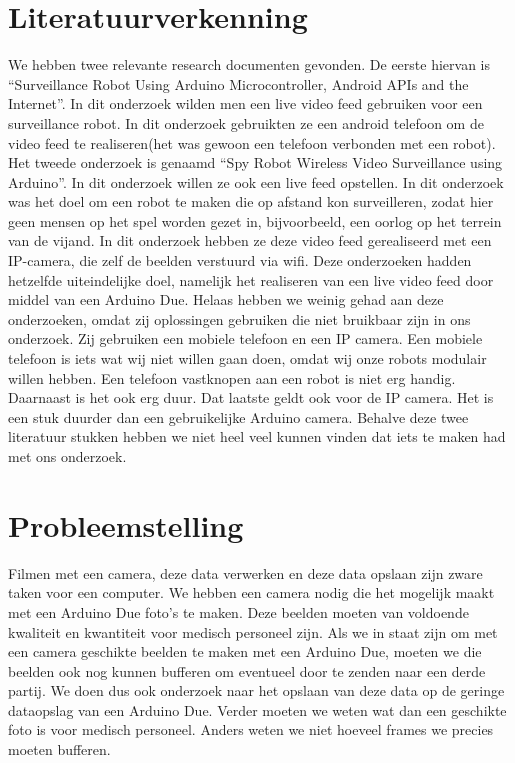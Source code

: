 \documentclass{article}
\begin{document}
\section{Literatuurverkenning}
We hebben twee relevante research documenten gevonden.
De eerste hiervan is “Surveillance Robot Using Arduino Microcontroller, Android APIs and the Internet”. In dit onderzoek wilden men een live video feed gebruiken voor een surveillance robot. In dit onderzoek gebruikten ze een android telefoon om de video feed te realiseren(het was gewoon een telefoon verbonden met een robot). 
Het tweede onderzoek is genaamd “Spy Robot Wireless Video Surveillance using Arduino”. 
In dit onderzoek willen ze ook een live feed opstellen. In dit onderzoek was het doel om een robot te maken die op afstand kon surveilleren, zodat hier geen mensen op het spel worden gezet in, bijvoorbeeld, een oorlog op het terrein van de vijand. 
In dit onderzoek hebben ze deze video feed gerealiseerd met een IP-camera, die zelf de beelden verstuurd via wifi. 
Deze onderzoeken hadden hetzelfde uiteindelijke doel, namelijk het realiseren van een live video feed door middel van een Arduino Due. Helaas hebben we weinig gehad aan deze onderzoeken, omdat zij oplossingen gebruiken die niet bruikbaar zijn in ons onderzoek. Zij gebruiken een mobiele telefoon en een IP camera. Een mobiele telefoon is iets wat wij niet willen gaan doen, omdat wij onze robots modulair willen hebben. Een telefoon vastknopen aan een robot is niet erg handig. Daarnaast is het ook erg duur. Dat laatste geldt ook voor de IP camera. Het is een stuk duurder dan een gebruikelijke Arduino camera.
Behalve deze twee literatuur stukken hebben we niet heel veel kunnen vinden dat iets te maken had met ons onderzoek. 

\section{Probleemstelling}
Filmen met een camera, deze data verwerken en deze data opslaan zijn zware taken voor een computer. We hebben een camera nodig die het mogelijk maakt met een Arduino Due foto’s te maken. Deze beelden moeten van voldoende kwaliteit en kwantiteit voor medisch personeel zijn. Als we in staat zijn om met een camera geschikte beelden te maken met een Arduino Due, moeten we die beelden ook nog kunnen bufferen om eventueel door te zenden naar een derde partij. We doen dus ook onderzoek naar het opslaan van deze data op de geringe dataopslag van een Arduino Due. Verder moeten we weten wat dan een geschikte foto is voor medisch personeel. Anders weten we niet hoeveel frames we precies moeten bufferen. 

\end{document}

